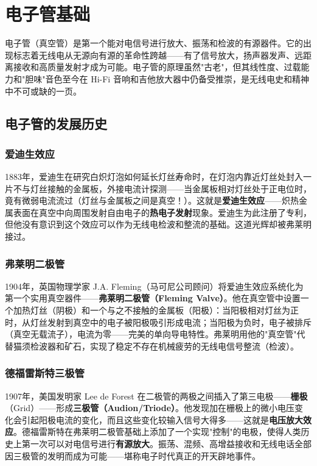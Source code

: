 \documentclass[12pt,UTF8]{ctexbook}
\begin{document}
\chapter{电子管基础}
\label{chap:vacuum_tube_basics}

电子管（真空管）是第一个能对电信号进行放大、振荡和检波的有源器件。它的出现标志着无线电从无源向有源的革命性跨越——有了信号放大，扬声器发声、远距离接收和高质量发射才成为可能。电子管的原理虽然"古老"，但其线性度、过载能力和"胆味"音色至今在 Hi-Fi 音响和吉他放大器中仍备受推崇，是无线电史和精神中不可或缺的一页。

\section{电子管的发展历史}
\label{sec:tube_history}

\subsection{爱迪生效应}

1883年，爱迪生在研究白炽灯泡如何延长灯丝寿命时，在灯泡内靠近灯丝处封入一片不与灯丝接触的金属板，外接电流计探测——当金属板相对灯丝处于正电位时，竟有微弱电流流过（灯丝与金属板之间是真空！）。这就是\textbf{爱迪生效应}——炽热金属表面在真空中向周围发射自由电子的\textbf{热电子发射}现象。爱迪生为此注册了专利，但他没有意识到这个效应可以作为无线电检波和整流的基础。这道光辉却被弗莱明接过。

\subsection{弗莱明二极管}

1904年，英国物理学家 J.A. Fleming（马可尼公司顾问）将爱迪生效应系统化为第一个实用真空器件——\textbf{弗莱明二极管（Fleming Valve）}。他在真空管中设置一个加热灯丝（阴极）和一个与之不接触的金属板（阳极）：当阳极相对灯丝为正时，从灯丝发射到真空中的电子被阳极吸引形成电流；当阳极为负时，电子被排斥（真空无载流子），电流为零——完美的单向导电特性。弗莱明用他的"真空管"代替猫须检波器和矿石，实现了稳定不存在机械疲劳的无线电信号整流（检波）。

\subsection{德福雷斯特三极管}

1907年，美国发明家 Lee de Forest 在二极管的两极之间插入了第三电极——\textbf{栅极}（Grid）——形成\textbf{三极管（Audion/Triode）}。他发现加在栅极上的微小电压变化会引起阳极电流的变化，而且这些变化较输入信号大得多——这就是\textbf{电压放大效应}。德福雷斯特在弗莱明二极管基础上添加了一个实现"控制"的电极，使得人类历史上第一次可以对电信号进行\textbf{有源放大}。振荡、混频、高增益接收和无线电话全部因三极管的发明而成为可能——堪称电子时代真正的开天辟地事件。
\end{document}
